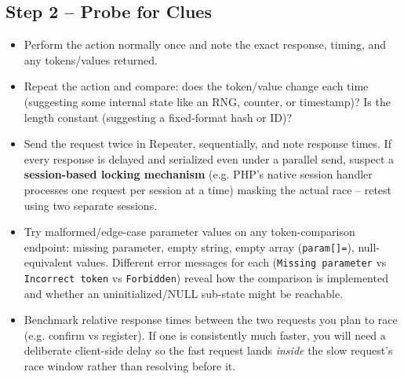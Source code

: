 \documentclass[11pt]{article}
\begin{document}
\subsection{Step 2 -- Probe for Clues}
\begin{itemize}[leftmargin=1.2em]
  \item Perform the action normally once and note the exact response, timing, and any tokens/values returned.
  \item Repeat the action and compare: does the token/value change each time (suggesting some internal state like an RNG, counter, or timestamp)? Is the length constant (suggesting a fixed-format hash or ID)?
  \item Send the request twice in Repeater, sequentially, and note response times. If every response is delayed and serialized even under a parallel send, suspect a \textbf{session-based locking mechanism} (e.g. PHP's native session handler processes one request per session at a time) masking the actual race -- retest using two separate sessions.
  \item Try malformed/edge-case parameter values on any token-comparison endpoint: missing parameter, empty string, empty array (\texttt{param[]=}), null-equivalent values. Different error messages for each (\texttt{Missing parameter} vs \texttt{Incorrect token} vs \texttt{Forbidden}) reveal how the comparison is implemented and whether an uninitialized/NULL sub-state might be reachable.
  \item Benchmark relative response times between the two requests you plan to race (e.g. confirm vs register). If one is consistently much faster, you will need a deliberate client-side delay so the fast request lands \emph{inside} the slow request's race window rather than resolving before it.
\end{itemize}
 
\end{document}
